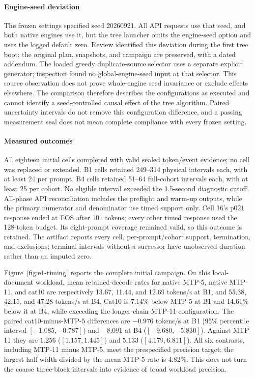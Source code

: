 \paragraph{Engine-seed deviation}
The frozen settings specified seed 20260921. All API requests use that seed, and both native engines use it, but the tree launcher omits the engine-seed option and uses the logged default zero. Review identified this deviation during the first tree boot; the original plan, snapshots, and campaign are preserved, with a dated addendum. The loaded greedy duplicate-source selector uses a separate explicit generator; inspection found no global-engine-seed input at that selector. This source observation does not prove whole-engine seed invariance or exclude effects elsewhere. The comparison therefore describes the configurations as executed and cannot identify a seed-controlled causal effect of the tree algorithm. Paired uncertainty intervals do not remove this configuration difference, and a passing measurement seal does not mean complete compliance with every frozen setting.

\paragraph{Measured outcomes}
All eighteen initial cells completed with valid sealed token/event evidence; no cell was replaced or extended. B1 cells retained 249--314 physical intervals each, with at least 24 per prompt. B4 cells retained 51--64 full-cohort intervals each, with at least 25 per cohort. No eligible interval exceeded the 1.5-second diagnostic cutoff. All-phase API reconciliation includes the preflight and warm-up outputs, while the primary numerator and denominator use timed support only. Cell 16's p021 response ended at EOS after 101 tokens; every other timed response used the 128-token budget. Its eight-prompt coverage remained valid, so this outcome is retained. The artifact reports every cell, per-prompt/cohort support, termination, and exclusions; terminal intervals without a successor have unobserved duration rather than an imputed zero.

Figure~\ref{fig:e1-timing} reports the complete initial campaign. On this local-document workload, mean retained-decode rates for native MTP-5, native MTP-11, and cat10 are respectively 13.67, 11.44, and 12.69 tokens/s at B1, and 55.38, 42.15, and 47.28 tokens/s at B4. Cat10 is 7.14\% below MTP-5 at B1 and 14.61\% below it at B4, while exceeding the longer-chain MTP-11 configuration. The paired cat10-minus-MTP-5 differences are $-0.976$ tokens/s at B1 (95\% percentile interval $[-1.085,-0.787]$) and $-8.091$ at B4 ($[-9.680,-5.830]$). Against MTP-11 they are $1.256$ ($[1.157,1.445]$) and $5.133$ ($[4.179,6.811]$). All six contrasts, including MTP-11 minus MTP-5, meet the prespecified precision target; the largest half-width divided by the mean MTP-5 rate is 4.82\%. This does not turn the coarse three-block intervals into evidence of broad workload precision.

